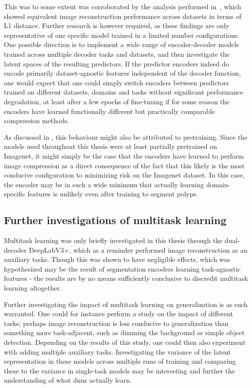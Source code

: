         This was to some extent was corroborated by the analysis performed in~, which showed equivalent image reconstruction performance across datasets in terms of L1 distance. Further research is however required, as these findings are only representative of one specific model trained in a limited number configurations. One possible direction is to implement a wide range of encoder-decoder models trained across multiple decoder tasks and datasets, and then investigate the latent spaces of the resulting predictors. If the predictor encoders indeed do encode primarily dataset-agnostic features independent of the decoder function, one would expect that one could simply switch encoders between predictors trained on different datasets, domains and tasks without significant performance degradation, at least after a few epochs of fine-tuning if for some reason the encoders have learned functionally different but practically comparable compression methods. 

        As discussed in , this behaviour might also be attributed to pretraining. Since the models used throughout this thesis were at least partially pretrained on Imagenet, it might simply be the case that the encoders have learned to perform image compression as a direct consequence of the fact that this likely is the most conducive configuration to minimizing risk on the Imagenet dataset. In this case, the encoder may be in such a wide minimum that actually learning domain-specific features is unlikely even after training to segment polyps. 

    \subsection{Further investigations of multitask learning}
        Multitask learning was only briefly investigated in this thesis through the dual-decoder DeepLabV3+, which as a reminder performed image reconstruction as an auxiliary tasks. Though this was shown to have negligible effects, which was hypothesized may be the result of segmentation encoders learning task-agnostic features - the results are by no means sufficiently conclusive to discredit multitask learning altogether. 
    
        Further investigating the impact of multitask learning on generalization is as such warranted. One could for instance perform a study on the impact of different tasks; perhaps image reconstruction is less conducive to generalization than something more task-adjacent, such as dimming the background or simple object detection. Depending on the results of this study, one could then also experiment with adding multiple auxiliary tasks. Investigating the variance of the latent representation in these models across multiple runs of training and comparing these to the variance in single-task models may be interesting and further the understanding of what \glspl{dnn} actually learn.
        
